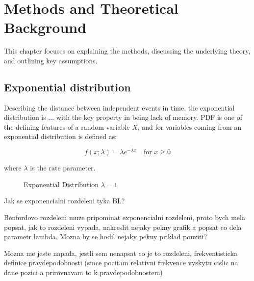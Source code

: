 \chapter{Methods and Theoretical Background}

This chapter focuses on explaining the methods, discussing the underlying theory, and outlining key assumptions. 

\section{Exponential distribution}

Describing the distance between independent events in time, the exponential distribution is \textcolor{blue}{...} with the key property in being lack of memory. PDF is one of the defining features of a random variable $X$, and for variables coming from an exponential distribution is defined as: 

\begin{equation}
    f(x;\lambda) = \lambda e^{-\lambda x} \quad \text{for } x \ge 0 
\end{equation}

where $\lambda$ is the rate parameter. \cite{Marek2024}

\begin{figure}[h]
    \centering
    \caption{Exponential Distribution $\lambda = 1$}
    \label{fig:Exp1}
\end{figure}

\begin{koment}
    Jak se exponencialni rozdeleni tyka BL? 

    Benfordovo rozdeleni muze pripominat exponencialni rozdeleni, proto bych mela popsat, jak to rozdeleni vypada, nakreslit nejaky pekny grafik a popsat co dela parametr lambda. Mozna by se hodil nejaky pekny priklad pouziti? 

    Mozna me jeste napada, jestli sem nenapsat co je to rozdeleni, frekventisticka definice pravdepodobnosti (since pocitam relativni frekvence vyskytu cislic na dane pozici a prirovnavam to k pravdepodobnostem) 
\end{koment}

